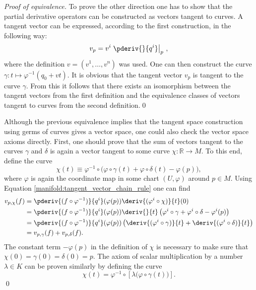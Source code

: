 {\begin{mdframed}[roundcorner=10pt, linecolor=blue, linewidth=1pt]
\begin{proof}[Proof of equivalence]
                To prove the other direction one has to show that the partial derivative operators can be constructed as vectors tangent to curves. A tangent vector can be expressed, according to the first construction, in the following way: \[v_p = v^i\left.\pderiv{}{q^i}\right|_p\,,\] where the definition $v = (v^1,\ldots,v^n)$ was used. One can then construct the curve $\gamma:t\mapsto\varphi^{-1}(q_0+vt)$. It is obvious that the tangent vector $v_p$ is tangent to the curve $\gamma$. From this it follows that there exists an isomorphism between the tangent vectors from the first definition and the equivalence classes of vectors tangent to curves from the second definition.\qed

                Although the previous equivalence implies that the tangent space construction using germs of curves gives a vector space, one could also check the vector space axioms directly. First, one should prove that the sum of vectors tangent to the curves $\gamma$ and $\delta$ is again a vector tangent to some curve $\chi:\mathbb{R}\rightarrow M$. To this end, define the curve \[\chi(t)\equiv\varphi^{-1}\circ\Big(\varphi\circ\gamma(t) + \varphi\circ\delta(t) - \varphi(p)\Big),\] where $\varphi$ is again the coordinate map in some chart $(U,\varphi)$ around $p\in M$. Using Equation \eqref{manifold:tangent_vector_chain_rule} one can find
                \begin{align*}
                    v_{p,\chi}(f) &= \pderiv{(f\circ\varphi^{-1})}{q^i}(\varphi(p))\deriv{(\varphi^i\circ\chi)}{t}(0)\\
                    &=\pderiv{(f\circ\varphi^{-1})}{q^i}(\varphi(p))\deriv{}{t}\left(\varphi^i\circ\gamma + \varphi^i\circ\delta - \varphi^i(p)\right)\\
                    &=\pderiv{(f\circ\varphi^{-1})}{q^i}(\varphi(p))\left(\deriv{(\varphi^i\circ\gamma)}{t} + \deriv{(\varphi^i\circ\delta)}{t}\right)\\
                    &=v_{p,\gamma}(f) + v_{p,\delta}(f).
                \end{align*}
                The constant term $-\varphi(p)$ in the definition of $\chi$ is necessary to make sure that $\chi(0) = \gamma(0) = \delta(0) = p$. The axiom of scalar multiplication by a number $\lambda\in K$ can be proven similarly by defining the curve \[\chi(t) = \varphi^{-1}\circ\left[\lambda\Big(\varphi\circ\gamma(t)\Big)\right].\]\qed
            \end{proof}
        \end{mdframed}
    }


